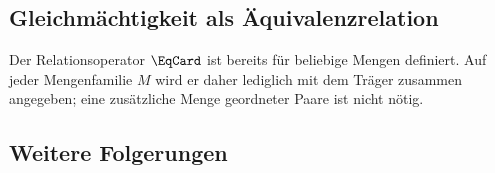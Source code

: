 \documentclass[main.tex]{subfiles}
\begin{document}
\subsection{Gleichmächtigkeit als Äquivalenzrelation}

Der Relationsoperator \(\EqCard\) ist bereits für beliebige Mengen definiert.
Auf jeder Mengenfamilie \(M\) wird er daher lediglich mit dem Träger
zusammen angegeben; eine zusätzliche Menge geordneter Paare ist nicht nötig.

\begin{tabproofsplit}

\closeproofpart

  \setcounter{proofstepnr}{1}%

\closeproofpart

  \setcounter{proofstepnr}{2}%

\closeproofpart

  \setcounter{proofstepnr}{3}%

\closeproofpart
\end{tabproofsplit}

\subsection{Weitere Folgerungen}
\end{document}
